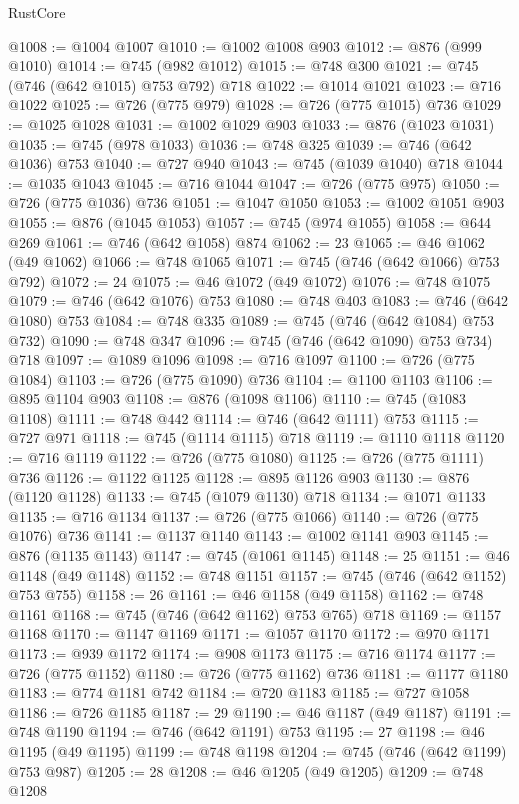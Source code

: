 \begin{lexlean}{RustCore}
\begin{coremodule}
@1008 := @1004 @1007
@1010 := @1002 @1008 @903
@1012 := @876 (@999 @1010)
@1014 := @745 (@982 @1012)
@1015 := @748 @300
@1021 := @745 (@746 (@642 @1015) @753 @792) @718
@1022 := @1014 @1021
@1023 := @716 @1022
@1025 := @726 (@775 @979)
@1028 := @726 (@775 @1015) @736
@1029 := @1025 @1028
@1031 := @1002 @1029 @903
@1033 := @876 (@1023 @1031)
@1035 := @745 (@978 @1033)
@1036 := @748 @325
@1039 := @746 (@642 @1036) @753
@1040 := @727 @940
@1043 := @745 (@1039 @1040) @718
@1044 := @1035 @1043
@1045 := @716 @1044
@1047 := @726 (@775 @975)
@1050 := @726 (@775 @1036) @736
@1051 := @1047 @1050
@1053 := @1002 @1051 @903
@1055 := @876 (@1045 @1053)
@1057 := @745 (@974 @1055)
@1058 := @644 @269
@1061 := @746 (@642 @1058) @874
@1062 := 23
@1065 := @46 @1062 (@49 @1062)
@1066 := @748 @1065
@1071 := @745 (@746 (@642 @1066) @753 @792)
@1072 := 24
@1075 := @46 @1072 (@49 @1072)
@1076 := @748 @1075
@1079 := @746 (@642 @1076) @753
@1080 := @748 @403
@1083 := @746 (@642 @1080) @753
@1084 := @748 @335
@1089 := @745 (@746 (@642 @1084) @753 @732)
@1090 := @748 @347
@1096 := @745 (@746 (@642 @1090) @753 @734) @718
@1097 := @1089 @1096
@1098 := @716 @1097
@1100 := @726 (@775 @1084)
@1103 := @726 (@775 @1090) @736
@1104 := @1100 @1103
@1106 := @895 @1104 @903
@1108 := @876 (@1098 @1106)
@1110 := @745 (@1083 @1108)
@1111 := @748 @442
@1114 := @746 (@642 @1111) @753
@1115 := @727 @971
@1118 := @745 (@1114 @1115) @718
@1119 := @1110 @1118
@1120 := @716 @1119
@1122 := @726 (@775 @1080)
@1125 := @726 (@775 @1111) @736
@1126 := @1122 @1125
@1128 := @895 @1126 @903
@1130 := @876 (@1120 @1128)
@1133 := @745 (@1079 @1130) @718
@1134 := @1071 @1133
@1135 := @716 @1134
@1137 := @726 (@775 @1066)
@1140 := @726 (@775 @1076) @736
@1141 := @1137 @1140
@1143 := @1002 @1141 @903
@1145 := @876 (@1135 @1143)
@1147 := @745 (@1061 @1145)
@1148 := 25
@1151 := @46 @1148 (@49 @1148)
@1152 := @748 @1151
@1157 := @745 (@746 (@642 @1152) @753 @755)
@1158 := 26
@1161 := @46 @1158 (@49 @1158)
@1162 := @748 @1161
@1168 := @745 (@746 (@642 @1162) @753 @765) @718
@1169 := @1157 @1168
@1170 := @1147 @1169
@1171 := @1057 @1170
@1172 := @970 @1171
@1173 := @939 @1172
@1174 := @908 @1173
@1175 := @716 @1174
@1177 := @726 (@775 @1152)
@1180 := @726 (@775 @1162) @736
@1181 := @1177 @1180
@1183 := @774 @1181 @742
@1184 := @720 @1183
@1185 := @727 @1058
@1186 := @726 @1185
@1187 := 29
@1190 := @46 @1187 (@49 @1187)
@1191 := @748 @1190
@1194 := @746 (@642 @1191) @753
@1195 := 27
@1198 := @46 @1195 (@49 @1195)
@1199 := @748 @1198
@1204 := @745 (@746 (@642 @1199) @753 @987)
@1205 := 28
@1208 := @46 @1205 (@49 @1205)
@1209 := @748 @1208

\end{coremodule}
\end{lexlean}
